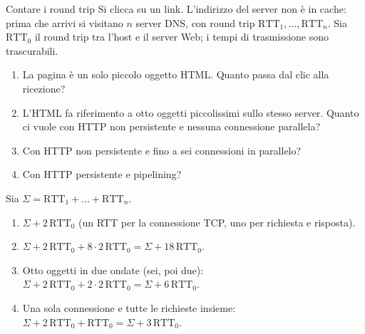 \begin{esercizio}{Contare i round trip}
Si clicca su un link. L'indirizzo del server non è in cache: prima che arrivi si visitano $n$ server DNS, con round trip
$\text{RTT}_1, \dots, \text{RTT}_n$. Sia $\text{RTT}_0$ il round trip tra l'host e il server Web; i tempi di trasmissione sono trascurabili.
\begin{enumerate}[label=(\alph*)]
    \item La pagina è un solo piccolo oggetto HTML. Quanto passa dal clic alla ricezione?
    \item L'HTML fa riferimento a otto oggetti piccolissimi sullo stesso server. Quanto ci vuole con HTTP non persistente e nessuna
          connessione parallela?
    \item Con HTTP non persistente e fino a sei connessioni in parallelo?
    \item Con HTTP persistente e pipelining?
\end{enumerate}

\svolgimento
Sia $\Sigma = \text{RTT}_1 + \dots + \text{RTT}_n$.
\begin{enumerate}[label=(\alph*)]
    \item $\Sigma + 2\,\text{RTT}_0$ (un RTT per la connessione TCP, uno per richiesta e risposta).
    \item $\Sigma + 2\,\text{RTT}_0 + 8 \cdot 2\,\text{RTT}_0 = \Sigma + 18\,\text{RTT}_0$.
    \item Otto oggetti in due ondate (sei, poi due): $\Sigma + 2\,\text{RTT}_0 + 2 \cdot 2\,\text{RTT}_0 = \Sigma + 6\,\text{RTT}_0$.
    \item Una sola connessione e tutte le richieste insieme: $\Sigma + 2\,\text{RTT}_0 + \text{RTT}_0 = \Sigma + 3\,\text{RTT}_0$.
\end{enumerate}
\end{esercizio}

